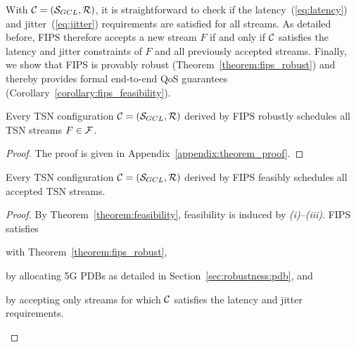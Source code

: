 With $\Conf = (\GCL, \R{})$, it is straightforward to check if the latency~(\ref{eq:latency}) and jitter~(\ref{eq:jitter}) requirements are satisfied for all streams. 
As detailed before, FIPS therefore accepts a new stream $F$ if and only if $\mathcal{C}$ satisfies the latency and jitter constraints of $F$ and all previously accepted streams.
Finally, we show that FIPS is provably robust (Theorem~\ref{theorem:fips_robust}) and thereby provides formal end-to-end QoS guarantees (Corollary~\ref{corollary:fips_feasibility}).

\begin{theorem} \label{theorem:fips_robust}
  Every TSN configuration $\Conf = (\GCL, \R{})$ derived by FIPS robustly schedules all TSN streams $F \in \mathcal{F}$.
\end{theorem}
\begin{proof}
  The proof is given in Appendix~\ref{appendix:theorem_proof}.
\end{proof}

\begin{corollary} \label{corollary:fips_feasibility}
  Every TSN configuration $\Conf = (\GCL, \R{})$ derived by FIPS feasibly schedules all accepted TSN streams.
\end{corollary}
\begin{proof}
  By Theorem~\ref{theorem:feasibility}, feasibility is induced by \textit{(i)}--\textit{(iii)}.
  FIPS satisfies
  \begin{enumerate*}[label=(\roman*)]
    \item with Theorem~\ref{theorem:fips_robust}, 
    \item by allocating 5G PDBs as detailed in Section~\ref{sec:robustness:pdb}, and
    \item by accepting only streams for which $\mathcal{C}$ satisfies the latency and jitter requirements.
  \end{enumerate*}
\end{proof}
